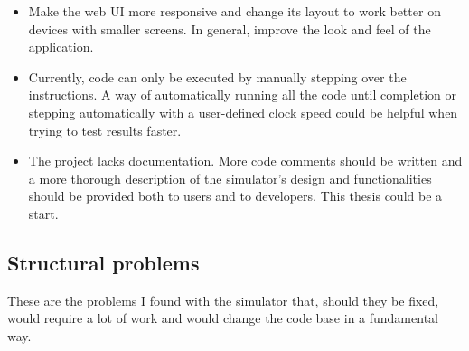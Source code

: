 \begin{itemize}
\begin{itemize}[label=$\rightarrow$]
	\end{itemize}
	\item Make the web UI more responsive and change its layout to work better on devices with smaller screens. In general, improve the look and feel of the application.
	\item Currently, code can only be executed by manually stepping over the instructions. A way of automatically running all the code until completion or stepping automatically with a user-defined clock speed could be helpful when trying to test results faster.
	\item The project lacks documentation. More code comments should be written and a more thorough description of the simulator's design and functionalities should be provided both to users and to developers. This thesis could be a start.
\end{itemize}

\subsection*{Structural problems}

These are the problems I found with the simulator that, should they be fixed, would require a lot of work and would change the code base in a fundamental way.

